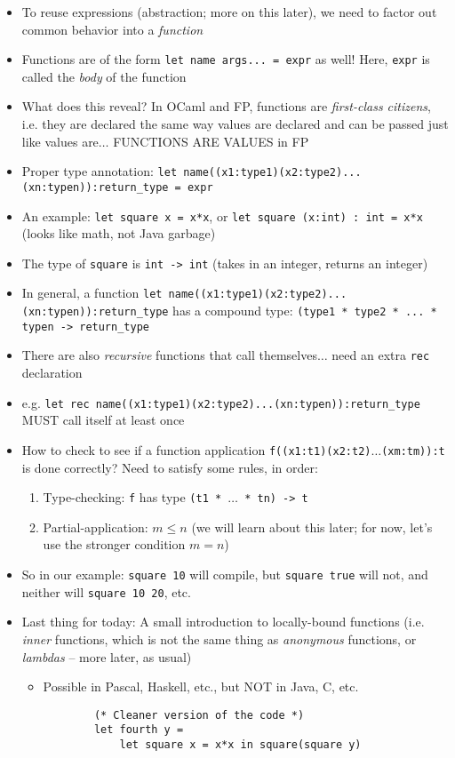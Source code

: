 \begin{itemize}
    \item To reuse expressions (abstraction; more on this later), we need to factor out common behavior into a \textit{function}
    \item Functions are of the form \lstinline{let name args... = expr} as well! Here, \texttt{expr} is called the \textit{body} of the function
    \item What does this reveal? In \textsf{OCaml} and FP, functions are \textit{first-class citizens}, i.e. they are declared the same way values are declared and can be passed just like values are$\ldots$ FUNCTIONS ARE VALUES in FP
    \item Proper type annotation: \lstinline{let name((x1:type1)(x2:type2)...(xn:typen)):return_type = expr}
    \item An example: \lstinline{let square x = x*x}, or \lstinline{let square (x:int) : int = x*x} (looks like math, not \textsf{Java} garbage)
    \item The type of \texttt{square} is \texttt{int -> int} (takes in an integer, returns an integer)
    \item In general, a function \lstinline{let name((x1:type1)(x2:type2)...(xn:typen)):return_type} has a compound type: \texttt{(type1 * type2 * ... * typen -> return\_type}
    \item There are also \textit{recursive} functions that call themselves$\ldots$ need an extra \texttt{rec} declaration
    \item e.g. \lstinline{let rec name((x1:type1)(x2:type2)...(xn:typen)):return_type} MUST call itself at least once
    \item How to check to see if a function application \texttt{f((x1:t1)(x2:t2)$\ldots$(xm:tm)):t} is done correctly? Need to satisfy some rules, in order:
    \begin{enumerate}
        \item Type-checking: \texttt{f} has type \texttt{(t1 * $\ldots$ * tn) -> t}
        \item Partial-application: $m \leq n$ (we will learn about this later; for now, let's use the stronger condition $m = n$)
    \end{enumerate}
    \item So in our example: \texttt{square 10} will compile, but \texttt{square true} will not, and neither will \texttt{square 10 20}, etc.
    \item Last thing for today: A small introduction to locally-bound functions (i.e. \textit{inner} functions, which is not the same thing as \textit{anonymous} functions, or \textit{lambdas} -- more later, as usual)
    \begin{itemize}
        \item Possible in \textsf{Pascal}, \textsf{Haskell}, etc., but NOT in \textsf{Java}, \textsf{C}, etc.
        \begin{lstlisting}
        (* Cleaner version of the code *)
        let fourth y = 
            let square x = x*x in square(square y)
        

\end{lstlisting}
\end{itemize}
\end{itemize}
